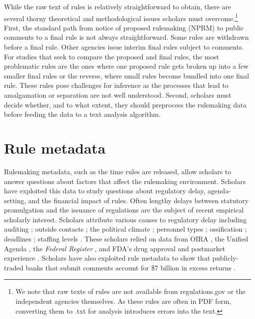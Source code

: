 \documentclass[
      12pt,
        ]{article}
\begin{document}
While the raw text of rules is relatively straightforward to obtain,
there are several thorny theoretical and methodological issues scholars
must overcome.\footnote{We note that raw texts of rules are not
  available from regulations.gov or the independent agencies themselves.
  As these rules are often in PDF form, converting them to .txt for
  analysis introduces errors into the text.} First, the standard path
from notice of proposed rulemaking (NPRM) to public comments to a final
rule is not always straightforward. Some rules are withdrawn before a
final rule. Other agencies issue interim final rules subject to
comments. For studies that seek to compare the proposed and final rules,
the most problematic rules are the ones where one proposed rule gets
broken up into a few smaller final rules or the reverse, where small
rules become bundled into one final rule. These rules pose challenges
for inference as the processes that lead to amalgamation or separation
are not well understood. Second, scholars must decide whether, and to
what extent, they should preprocess the rulemaking data before feeding
the data to a text analysis algorithm.

\hypertarget{rule-metadata}{%
\section{Rule metadata}\label{rule-metadata}}

Rulemaking metadata, such as the time rules are released, allow scholars
to answer questions about factors that affect the rulemaking
environment. Scholars have exploited this data to study questions about
regulatory delay, agenda-setting, and the financial impact of rules.
Often lengthy delays between statutory promulgation and the issuance of
regulations are the subject of recent empirical scholarly interest.
Scholars attribute various causes to regulatory delay including auditing
\citep{ACSPSQ2013}; outside contacts \citep{BallaALR2011}; the political
climate \citep[\citet{ThrowerPSQ2018}]{PotterJOP2017}; personnel types
\citep{CarriganPAR2019}; ossification \citep{YackeeGWLR2012}; deadlines
\citep[\citet{CarpenterAJPS2011},\citet{BertelliPAR2019}]{LavertuJPART2012};
staffing levels \citep{BoltonJLEO2015}. These scholars relied on data
from OIRA
\citep[\citet{BallaALR2011},\citet{BoltonJLEO2015},\citet{CarriganPAR2019}]{ACSPSQ2013},
the Unified Agenda
\citep[\citet{PotterJOP2017},\citet{LavertuJPART2012},\citet{Potter2019}]{BertelliPAR2019},
the \emph{Federal Register}
\citep[\citet{ThrowerPSQ2018}]{YackeeGWLR2012}, and FDA's drug approval
and postmarket experience \citep{CarpenterAJPS2011}. Scholars have also
exploited rule metadata to show that publicly-traded banks that submit
comments account for \$7 billion in excess returns \citep{Libgober2018}.
\end{document}
